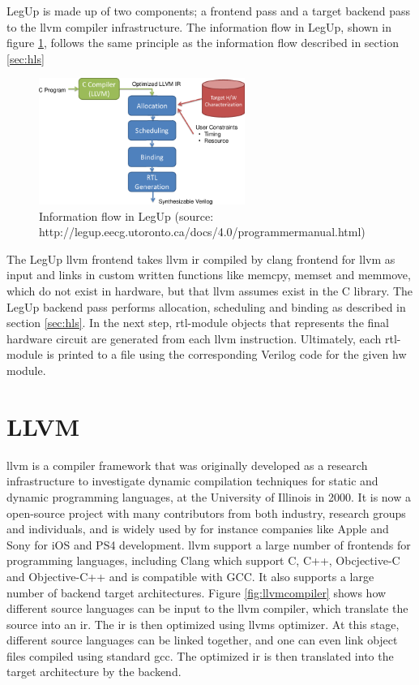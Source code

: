 LegUp is made up of two components; a frontend pass and a target backend pass to the \gls{llvm} compiler infrastructure. 
The information flow in LegUp, shown in figure \ref{fig:legupflow}, follows the same principle as the information flow described in section \ref{sec:hls} 
\begin{figure}[hbpt]
\centering
\includegraphics[width=0.6\textwidth]{../figs/LegUpFlow.png}
\caption{\label{fig:legupflow}Information flow in LegUp (source: http://legup.eecg.utoronto.ca/docs/4.0/programmermanual.html)}
\end{figure}
The LegUp \gls{llvm} frontend takes \gls{llvm} \gls{ir} compiled by clang frontend for \gls{llvm} as input and links in custom written functions like memcpy, memset and memmove, which do not exist in hardware, but that \gls{llvm} assumes exist in the C library. 
The LegUp backend pass performs allocation, scheduling and binding as described in section \ref{sec:hls}. In the next step, \gls{rtl}-module objects that represents the final hardware circuit are generated from each \gls{llvm} instruction. Ultimately, each \gls{rtl}-module is printed to a file using the corresponding Verilog code for the given \gls{hw} module.

\section{\label{sec:LLVM}LLVM}

\gls{llvm} \cite{LLVM:CGO04} is a compiler framework that was originally developed as a research infrastructure to investigate dynamic compilation techniques for static and dynamic programming languages, at the University of Illinois in 2000. It is now a open-source project with many contributors from both industry, research groups and individuals, and is widely used by for instance companies like Apple and Sony for iOS and PS4 development. \gls{llvm} support a large number of frontends for programming languages, including Clang \cite{clang} which support C, C++, Obcjective-C and Objective-C++ and is compatible with GCC. It also supports a large number of backend target architectures. Figure \ref{fig:llvmcompiler} shows how different source languages can be input to the \gls{llvm} compiler, which translate the source into an \gls{ir}. The \gls{ir} is then optimized using \gls{llvm}s optimizer. At this stage, different source languages can be linked together, and one can even link object files compiled using standard \gls{gcc}. The optimized \gls{ir} is then translated into the target architecture by the backend.

